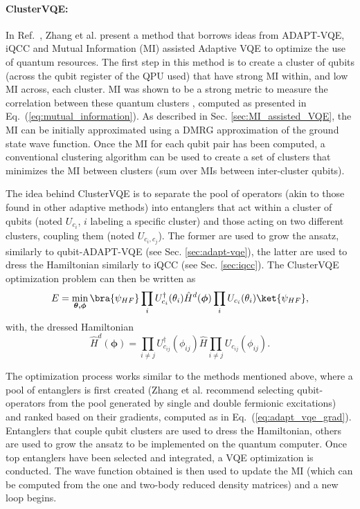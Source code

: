 \paragraph{ClusterVQE:} In Ref.~\cite{Zhang2021}, Zhang et al. present a method that borrows ideas from ADAPT-VQE, iQCC and Mutual Information (MI) assisted Adaptive VQE to optimize the use of quantum resources. The first step in this method is to create a cluster of qubits (across the qubit register of the QPU used) that have strong MI within, and low MI across, each cluster. MI was shown to be a strong metric to measure the correlation between these quantum clusters \cite{Rissler2006}, computed as presented in Eq.~(\ref{eq:mutual_information}). As described in Sec. \ref{sec:MI_assisted_VQE}, the MI can be initially approximated using a DMRG approximation of the ground state wave function. Once the MI for each qubit pair has been computed, a conventional clustering algorithm can be used to create a set of clusters that minimizes the MI between clusters (sum over MIs between inter-cluster qubits).

The idea behind ClusterVQE is to separate the pool of operators (akin to those found in other adaptive methods) into entanglers that act within a cluster of qubits (noted $U_{c_i}$, $i$ labeling a specific cluster) and those acting on two different clusters, coupling them (noted $U_{c_i, c_j}$). The former are used to grow the ansatz, similarly to qubit-ADAPT-VQE (see Sec. \ref{sec:adapt-vqe}), the latter are used to dress the Hamiltonian similarly to iQCC (see Sec. \ref{sec:iqcc}). The ClusterVQE optimization problem can then be written as
\begin{equation}
    E = \min_{\boldsymbol{\theta, \phi}}\bra{\psi_{HF}} \prod_i U_{c_i}^{\dagger}(\theta_i) \hat{H}^d(\boldsymbol{\phi}) \prod_i U_{c_i}(\theta_i) \ket{\psi_{HF}},
\end{equation}
with, the dressed Hamiltonian
\begin{equation}
    \hat{H}^d(\boldsymbol{\phi}) = \prod_{i\neq j}U_{c_{ij}}^{\dagger}(\phi_{ij}) \hat{H} \prod_{i\neq j}U_{c_{ij}}(\phi_{ij}).
\end{equation}

The optimization process works similar to the methods mentioned above, where a pool of entanglers is first created (Zhang et al. \cite{Zhang2021} recommend selecting qubit-operators from the pool generated by single and double fermionic excitations) and ranked based on their gradients, computed as in Eq.~(\ref{eq:adapt_vqe_grad}). Entanglers that couple qubit clusters are used to dress the Hamiltonian, others are used to grow the ansatz to be implemented on the quantum computer. Once top entanglers have been selected and integrated, a VQE optimization is conducted. The wave function obtained is then used to update the MI (which can be computed from the one and two-body reduced density matrices) and a new loop begins.


